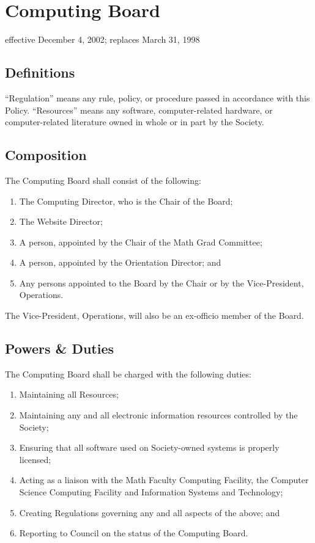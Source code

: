 \section{Computing Board}
effective December 4, 2002; replaces March 31, 1998

\subsection{Definitions}
“Regulation” means any rule, policy, or procedure passed in accordance with this Policy.
“Resources” means any software, computer-related hardware, or computer-related literature owned in whole or in part by the Society.

\subsection{Composition}
The Computing Board shall consist of the following:
\begin{enumerate}
\item The Computing Director, who is the Chair of the Board;
\item The Website Director;
\item A person, appointed by the Chair of the Math Grad Committee;
\item A person, appointed by the Orientation Director; and
\item Any persons appointed to the Board by the Chair or by the Vice-President, Operations.
\end{enumerate}
The Vice-President, Operations, will also be an ex-officio member of the Board.

\subsection{Powers \& Duties}
The Computing Board shall be charged with the following duties:
\begin{enumerate}
\item Maintaining all Resources;
\item Maintaining any and all electronic information resources controlled by the Society;
\item Ensuring that all software used on Society-owned systems is properly licensed;
\item Acting as a liaison with the Math Faculty Computing Facility, the Computer Science Computing Facility and Information Systems and Technology;
\item Creating Regulations governing any and all aspects of the above; and
\item Reporting to Council on the status of the Computing Board.
\end{enumerate}


